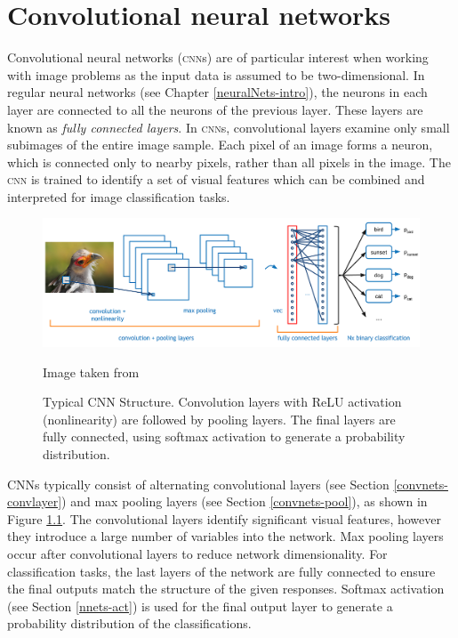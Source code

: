 %
%

\chapter{Convolutional neural networks}\label{convnets}

Convolutional neural networks (\textsc{cnn}s) are of particular interest when working with image problems as the input data is assumed to be two-dimensional. In regular neural networks (see Chapter \ref{neuralNets-intro}), the neurons in each layer are connected to all the neurons of the previous layer. These layers are known as \textit{fully connected layers}. In \textsc{cnn}s, convolutional layers examine only small subimages of the entire image sample. Each pixel of an image forms a neuron, which is connected only to nearby pixels, rather than all pixels in the image. The \textsc{cnn} is trained to identify a set of visual features which can be combined and interpreted for image classification tasks.

\begin{figure}[ht]
	\centering
	\includegraphics[width=\textwidth]{Images/4_cnn_structure.png}
	\caption{Typical CNN Structure. Convolution layers with ReLU activation (nonlinearity) are followed by pooling layers. The final layers are fully connected, using softmax activation to generate a probability distribution.}
	\small Image taken from \cite{ADeshpande2016}
	\label{convnets-structurefig}
\end{figure}

CNNs typically consist of alternating convolutional layers (see Section \ref{convnets-convlayer}) and max pooling layers (see Section \ref{convnets-pool}), as shown in Figure \ref{convnets-structurefig}. The convolutional layers identify significant visual features, however they introduce a large number of variables into the network. Max pooling layers occur after convolutional layers to reduce network dimensionality. For classification tasks, the last layers of the network are fully connected to ensure the final outputs match the structure of the given responses. Softmax activation (see Section \ref{nnets-act}) is used for the final output layer to generate a probability distribution of the classifications.

